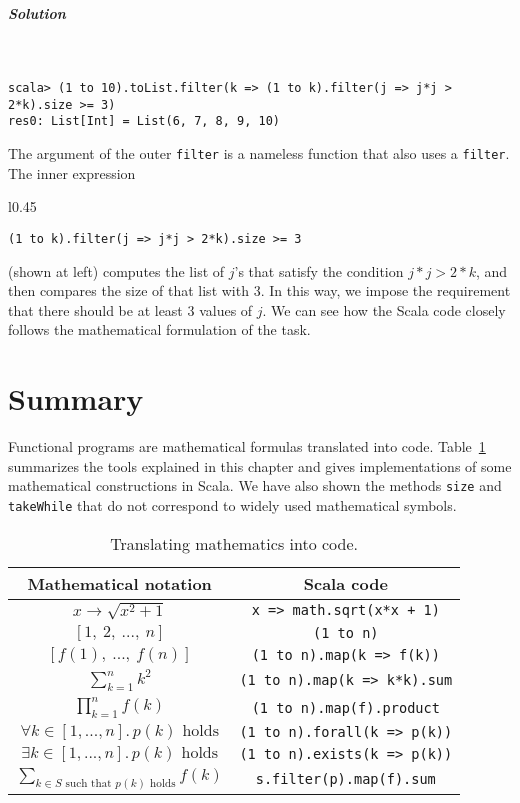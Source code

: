 \subparagraph{Solution}

~

\begin{lstlisting}
scala> (1 to 10).toList.filter(k => (1 to k).filter(j => j*j > 2*k).size >= 3)
res0: List[Int] = List(6, 7, 8, 9, 10) 
\end{lstlisting}
The argument of the outer \lstinline!filter! is a nameless function
that also uses a \lstinline!filter!. The inner expression

\noindent \begin{wrapfigure}{l}{0.45\columnwidth}%
\vspace{-0.8\baselineskip}
\begin{lstlisting}
(1 to k).filter(j => j*j > 2*k).size >= 3
\end{lstlisting}

\vspace{-1.5\baselineskip}
\end{wrapfigure}%
 (shown at left) computes the list of $j$\textsf{'}s that satisfy the condition
$j*j>2*k$, and then compares the size of that list with $3$. In
this way, we impose the requirement that there should be at least
$3$ values of $j$. We can see how the Scala code closely follows
the mathematical formulation of the task.

\section{Summary}

Functional programs are mathematical formulas translated into code.
Table~\ref{tab:translating-mathematics-into-code} summarizes the
tools explained in this chapter and gives implementations of some
mathematical constructions in Scala. We have also shown the methods
\lstinline!size! and \lstinline!takeWhile! that do not correspond
to widely used mathematical symbols.

\begin{table}
\begin{centering}
\begin{tabular}{|c|c|}
\hline 
\textbf{Mathematical notation} & \textbf{Scala code}\tabularnewline
\hline 
\hline 
$x\rightarrow\sqrt{x^{2}+1}$ & \lstinline!x => math.sqrt(x*x + 1)!\tabularnewline
\hline 
$\left[1,~2,~...,~n\right]$ & \lstinline!(1 to n)!\tabularnewline
\hline 
$\left[f(1),~...,~f(n)\right]$ & \lstinline!(1 to n).map(k => f(k))!\tabularnewline
\hline 
$\sum_{k=1}^{n}k^{2}$ & \lstinline!(1 to n).map(k => k*k).sum!\tabularnewline
\hline 
$\prod_{k=1}^{n}f(k)$ & \lstinline!(1 to n).map(f).product!\tabularnewline
\hline 
$\forall k\in[1,...,n].\,p(k)\text{ holds}$ & \lstinline!(1 to n).forall(k => p(k))!\tabularnewline
\hline 
$\exists k\in[1,...,n].\,p(k)\text{ holds}$ & \lstinline!(1 to n).exists(k => p(k))!\tabularnewline
\hline 
${\displaystyle \sum_{k\in S\text{ such that }p(k)\text{ holds}}}f(k)$ & \lstinline!s.filter(p).map(f).sum!\tabularnewline
\hline 
\end{tabular}
\par\end{centering}
\caption{Translating mathematics into code.\label{tab:translating-mathematics-into-code}}
\end{table}

